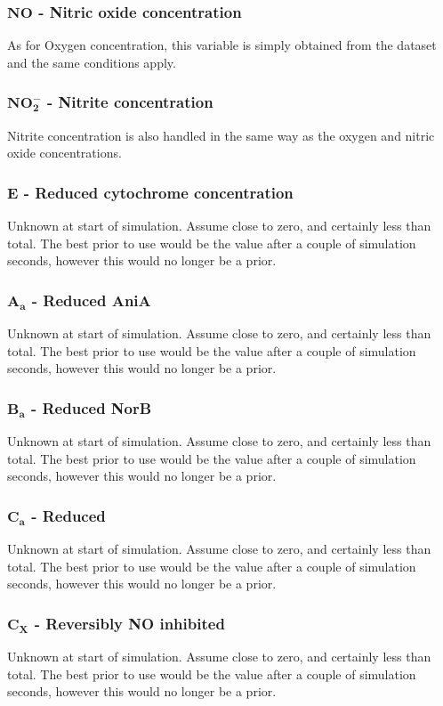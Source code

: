 \subsubsection*{$\mathbf{NO}$ {\bf- Nitric oxide concentration}}
As for Oxygen concentration, this variable is simply obtained from the dataset and the same conditions apply.

\subsubsection*{$\mathbf{NO_2^-}$ {\bf- Nitrite concentration}}
Nitrite concentration is also handled in the same way as the oxygen and nitric oxide concentrations.

\subsubsection*{$\mathbf{E}$ {\bf- Reduced cytochrome concentration}}
Unknown at start of simulation. Assume close to zero, and certainly less than total. The best prior to use would be the value after a couple of simulation seconds, however this would no longer be a prior.

\subsubsection*{$\mathbf{A_a}$ {\bf- Reduced AniA}}
Unknown at start of simulation. Assume close to zero, and certainly less than total. The best prior to use would be the value after a couple of simulation seconds, however this would no longer be a prior.

\subsubsection*{$\mathbf{B_a}$ {\bf- Reduced NorB}}
Unknown at start of simulation. Assume close to zero, and certainly less than total. The best prior to use would be the value after a couple of simulation seconds, however this would no longer be a prior.

\subsubsection*{$\mathbf{C_a}$ {\bf- Reduced \cbbthree{}}}
Unknown at start of simulation. Assume close to zero, and certainly less than total. The best prior to use would be the value after a couple of simulation seconds, however this would no longer be a prior.

\subsubsection*{$\mathbf{C_X}$ {\bf- Reversibly NO inhibited \cbbthree{}}}
Unknown at start of simulation. Assume close to zero, and certainly less than total. The best prior to use would be the value after a couple of simulation seconds, however this would no longer be a prior.

